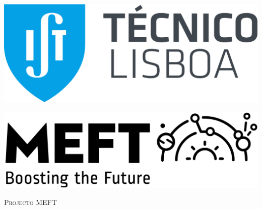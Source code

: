 \documentclass[
11pt, %
english, %
singlespacing, %
headsepline, %
]{MastersDoctoralThesis} %
\author{Rafael Pinto} %
\begin{document}
\theoremstyle{plain}
\newtheorem{lemma}{Lemma}
\pagestyle{plain} %


\begin{titlepage}

\begin{minipage}[t]{0.4\textwidth}
\begin{flushleft} 
\vspace{0pt}
\hspace{-1cm}
\includegraphics[scale=0.25]{logo.pdf}
\end{flushleft}
\end{minipage}
\hfill
\begin{minipage}[t]{0.41\textwidth}
\begin{flushright} 
\vspace{0pt}
\includegraphics[scale=0.08]{Logo-MEFT_Hor.png}
\end{flushright}
\end{minipage}

\begin{center}

\vspace*{.06\textheight}
{\scshape\LARGE \univname\par}\vspace{1.5cm} %
\textsc{\Large Projecto MEFT}\\[0.5cm] %


\end{center}
\end{titlepage}
\end{document}
